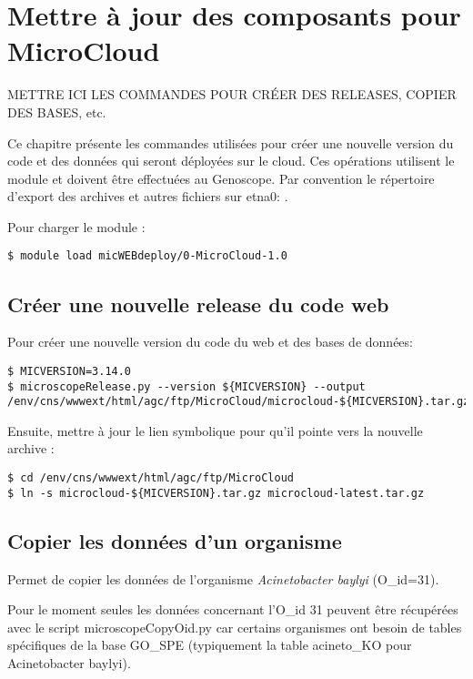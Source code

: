 \chapter{Mettre à jour des composants pour MicroCloud} \label{chap:creer_nouvelle_version}

\begin{mycolorbox}
	METTRE ICI LES COMMANDES POUR CRÉER DES RELEASES, COPIER DES BASES, etc.
\end{mycolorbox}

Ce chapitre présente les commandes utilisées pour créer une nouvelle version
du code et des données qui seront déployées sur le cloud.
Ces opérations utilisent le module \micWEBdeployVer
et doivent être effectuées au Genoscope.
Par convention le répertoire d'export des archives et autres fichiers sur etna0: .
\bigskip

Pour charger le module \micWEBdeployVer:
\begin{lstlisting}[style=bash]
$ module load micWEBdeploy/0-MicroCloud-1.0
\end{lstlisting}

\section{Créer une nouvelle release du code web}

Pour créer une nouvelle version du code du web et des bases de données:
\begin{lstlisting}[style=bash]
$ MICVERSION=3.14.0
$ microscopeRelease.py --version ${MICVERSION} --output /env/cns/wwwext/html/agc/ftp/MicroCloud/microcloud-${MICVERSION}.tar.gz
\end{lstlisting}

Ensuite, mettre à jour le lien symbolique pour qu'il pointe vers la nouvelle archive :
\begin{lstlisting}[style=bash]
$ cd /env/cns/wwwext/html/agc/ftp/MicroCloud
$ ln -s microcloud-${MICVERSION}.tar.gz microcloud-latest.tar.gz
\end{lstlisting}

\section{Copier les données d'un organisme}

Permet de copier les données de l'organisme \textit{Acinetobacter baylyi} (O\_id=31).

\begin{mycolorbox}
	Pour le moment seules les données concernant l'O\_id 31 peuvent être récupérées avec le script microscopeCopyOid.py car certains organismes ont besoin de tables spécifiques de la base GO\_SPE (typiquement la table acineto\_KO pour Acinetobacter baylyi).
\end{mycolorbox}

